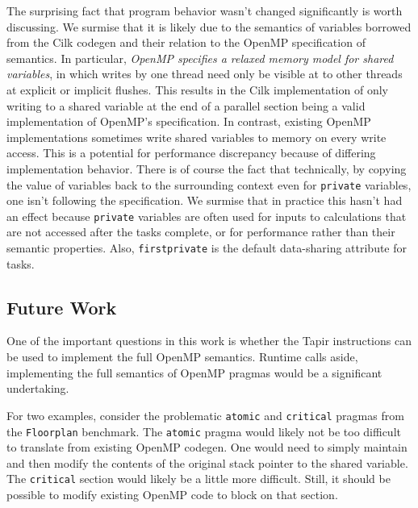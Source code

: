 \documentclass[sigconf]{acmart}
\begin{document}
The surprising fact that program behavior wasn't changed significantly is worth
discussing. We surmise that it is likely due to the semantics of variables
borrowed from the Cilk codegen and their relation to the OpenMP specification
of semantics. In particular, \emph{OpenMP specifies a relaxed memory model
for shared variables}, in which writes by one thread need only be visible at
to other threads at explicit or implicit flushes. 
This results in the Cilk implementation of only writing
to a shared variable at the end of a parallel section being a valid
implementation of OpenMP's specification. In contrast, existing OpenMP
implementations sometimes write shared variables to memory on every write
access. This is a potential for performance discrepancy because of differing
implementation behavior.
There is of course the fact that technically, by copying the value of variables
back to the surrounding context even for \texttt{private} variables, one isn't
following the specification. We surmise that in practice this hasn't had an
effect because \texttt{private} variables are often used for inputs to
calculations that are not accessed after the tasks complete, or for performance
rather than their semantic properties.  Also, \texttt{firstprivate} is the
default data-sharing attribute for tasks.

\subsection{Future Work} \label{Sec:Future}

One of the important questions in this work is whether the Tapir instructions
can be used to implement the full OpenMP semantics.
Runtime calls aside, implementing the full semantics of OpenMP pragmas would be
a significant undertaking. 

For two examples, consider the problematic \texttt{atomic} and
\texttt{critical} pragmas from the \texttt{Floorplan} benchmark. The
\texttt{atomic} pragma would likely not be too difficult to translate from
existing OpenMP codegen. One would need to simply maintain and then modify the
contents of the original stack pointer to the shared variable. The
\texttt{critical} section would likely be a little more difficult. Still, it
should be possible to modify existing OpenMP code to block on that section. 
\end{document}
